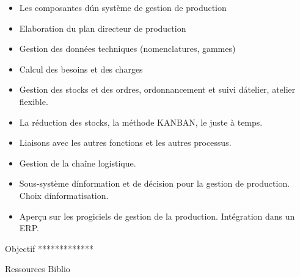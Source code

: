 {
\begin{itemize} 
\item  Les composantes d\'un système de gestion de production
\item  Elaboration du plan directeur de production
\item  Gestion des données techniques (nomenclatures, gammes)
\item  Calcul des besoins et des charges
\item  Gestion des stocks et des ordres, ordonnancement et suivi d\'atelier, atelier flexible.
\item  La réduction des stocks, la méthode KANBAN, le juste à temps.
\item  Liaisons avec les autres fonctions et les autres processus.
\item  Gestion de la chaîne logistique.
\item  Sous-système d\'information et de décision pour la gestion de production. Choix d\'informatisation.
\item  Aperçu sur les progiciels de gestion de la production. Intégration dans un ERP.
\end{itemize} 
} 
{} 
{\begin{itemize} 
  \ObjItem Objectif *************
\end{itemize} 
} 
{Ressources} 
{Biblio} 
 
\vfill

